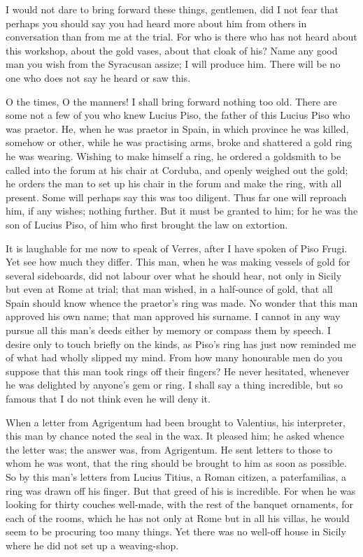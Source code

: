  I would not dare to bring forward these things, gentlemen, did I not fear that perhaps you should say you had heard more about him from others in conversation than from me at the trial. For who is there who has not heard about this workshop, about the gold vases, about that cloak of his? Name any good man you wish from the Syracusan assize; I will produce him. There will be no one who does not say he heard or saw this.

 O the times, O the manners! I shall bring forward nothing too old. There are some not a few of you who knew Lucius Piso, the father of this Lucius Piso who was praetor. He, when he was praetor in Spain, in which province he was killed, somehow or other, while he was practising arms, broke and shattered a gold ring he was wearing. Wishing to make himself a ring, he ordered a goldsmith to be called into the forum at his chair at Corduba, and openly weighed out the gold; he orders the man to set up his chair in the forum and make the ring, with all present. Some will perhaps say this was too diligent. Thus far one will reproach him, if any wishes; nothing further. But it must be granted to him; for he was the son of Lucius Piso, of him who first brought the law on extortion.

 It is laughable for me now to speak of Verres, after I have spoken of Piso Frugi. Yet see how much they differ. This man, when he was making vessels of gold for several sideboards, did not labour over what he should hear, not only in Sicily but even at Rome at trial; that man wished, in a half-ounce of gold, that all Spain should know whence the praetor's ring was made. No wonder that this man approved his own name; that man approved his surname. I cannot in any way pursue all this man's deeds either by memory or compass them by speech. I desire only to touch briefly on the kinds, as Piso's ring has just now reminded me of what had wholly slipped my mind. From how many honourable men do you suppose that this man took rings off their fingers? He never hesitated, whenever he was delighted by anyone's gem or ring. I shall say a thing incredible, but so famous that I do not think even he will deny it.

 When a letter from Agrigentum had been brought to Valentius, his interpreter, this man by chance noted the seal in the wax. It pleased him; he asked whence the letter was; the answer was, from Agrigentum. He sent letters to those to whom he was wont, that the ring should be brought to him as soon as possible. So by this man's letters from Lucius Titius, a Roman citizen, a paterfamilias, a ring was drawn off his finger. But that greed of his is incredible. For when he was looking for thirty couches well-made, with the rest of the banquet ornaments, for each of the rooms, which he has not only at Rome but in all his villas, he would seem to be procuring too many things. Yet there was no well-off house in Sicily where he did not set up a weaving-shop.


